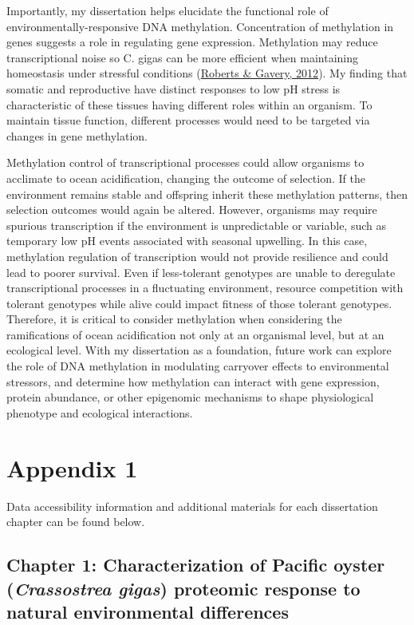 \documentclass [11pt, proquest] {uwthesis}[2015/03/03]
\begin{document}
Importantly, my dissertation helps elucidate the functional role of environmentally-responsive DNA methylation. Concentration of methylation in genes suggests a role in regulating gene expression. Methylation may reduce transcriptional noise so C. gigas can be more efficient when maintaining homeostasis under stressful conditions (\protect\hyperlink{ref-Roberts2012}{Roberts \& Gavery, 2012}). My finding that somatic and reproductive have distinct responses to low pH stress is characteristic of these tissues having different roles within an organism. To maintain tissue function, different processes would need to be targeted via changes in gene methylation.

Methylation control of transcriptional processes could allow organisms to acclimate to ocean acidification, changing the outcome of selection. If the environment remains stable and offspring inherit these methylation patterns, then selection outcomes would again be altered. However, organisms may require spurious transcription if the environment is unpredictable or variable, such as temporary low pH events associated with seasonal upwelling. In this case, methylation regulation of transcription would not provide resilience and could lead to poorer survival. Even if less-tolerant genotypes are unable to deregulate transcriptional processes in a fluctuating environment, resource competition with tolerant genotypes while alive could impact fitness of those tolerant genotypes. Therefore, it is critical to consider methylation when considering the ramifications of ocean acidification not only at an organismal level, but at an ecological level. With my dissertation as a foundation, future work can explore the role of DNA methylation in modulating carryover effects to environmental stressors, and determine how methylation can interact with gene expression, protein abundance, or other epigenomic mechanisms to shape physiological phenotype and ecological interactions.

\appendix

\hypertarget{appendix-1}{%
\chapter{Appendix 1}\label{appendix-1}}

Data accessibility information and additional materials for each dissertation chapter can be found below.

\hypertarget{chapter-1-characterization-of-pacific-oyster-crassostrea-gigas-proteomic-response-to-natural-environmental-differences}{%
\section{\texorpdfstring{Chapter 1: Characterization of Pacific oyster (\emph{Crassostrea gigas}) proteomic response to natural environmental differences}{Chapter 1: Characterization of Pacific oyster (Crassostrea gigas) proteomic response to natural environmental differences}}\label{chapter-1-characterization-of-pacific-oyster-crassostrea-gigas-proteomic-response-to-natural-environmental-differences}}
\end{document}
